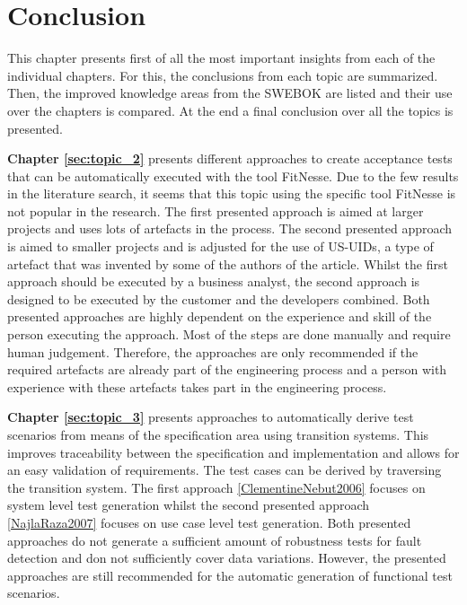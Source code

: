 \chapter{Conclusion} \label{chap:conclusion}

This chapter presents first of all the most important insights from each of the individual chapters. For this, the conclusions from each topic are summarized. Then, the improved knowledge areas from the SWEBOK are listed and their use over the chapters is compared. At the end a final conclusion over all the topics is presented.

\textbf{Chapter \ref{sec:topic_2}} presents different approaches to create acceptance tests that can be automatically executed with the tool FitNesse. Due to the few results in the literature search, it seems that this topic using the specific tool FitNesse is not popular in the research. The first presented approach \cite{el-attar} is aimed at larger projects and uses lots of artefacts in the process. The second presented approach \cite{longo} is aimed to smaller projects and is adjusted for the use of US-UIDs, a type of artefact that was invented by some of the authors of the article. Whilst the first approach should be executed by a business analyst, the second approach is designed to be executed by the customer and the developers combined.  Both presented approaches are highly dependent on the experience and skill of the person executing the approach. Most of the steps are done manually and require human judgement. Therefore, the approaches are only recommended if the required artefacts are already part of the engineering process and a person with experience with these artefacts takes part in the engineering process.

\textbf{Chapter \ref{sec:topic_3}} presents approaches to automatically derive test scenarios from means of the specification area using transition systems. This improves traceability between the specification and implementation and allows for an easy validation of requirements. The test cases can be derived by traversing the transition system. The first approach \ref{ClementineNebut2006} focuses on system level test generation whilst the second presented approach \ref{NajlaRaza2007} focuses on use case level test generation. Both presented approaches do not generate a sufficient amount of robustness tests for fault detection and don not sufficiently cover data variations. However, the presented approaches are still recommended for the automatic generation of functional test scenarios.

